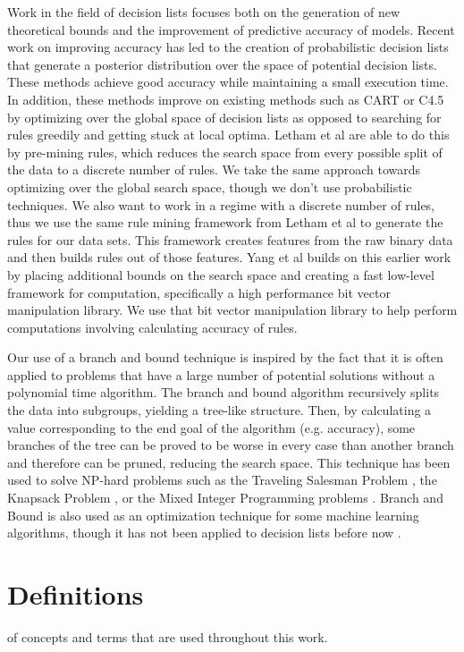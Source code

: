 \documentclass[]{report}
\theoremstyle{definition}
\begin{document}
Work in the field of decision lists focuses both on the generation of new theoretical bounds and the improvement of predictive accuracy of models.
Recent work on improving accuracy has led to the creation of probabilistic decision lists that generate a posterior distribution over the space of potential decision lists\cite{LethamRuMcMa15,YangRuSe16}.
These methods achieve good accuracy while maintaining a small execution time.
In addition, these methods improve on existing methods such as CART or C4.5 by optimizing over the global space of decision lists as opposed to searching for rules greedily and getting stuck at local optima.
Letham et al are able to do this by pre-mining rules, which reduces the search space from every possible split of the data to a discrete number of rules.
We take the same approach towards optimizing over the global search space, though we don’t use probabilistic techniques.
We also want to work in a regime with a discrete number of rules, thus we use the same rule mining framework from Letham et al to generate the rules for our data sets.
This framework creates features from the raw binary data and then builds rules out of those features.
Yang et al builds on this earlier work by placing additional bounds on the search space and creating a fast low-level framework for computation, specifically a high performance bit vector manipulation library.
We use that bit vector manipulation library to help perform computations involving calculating accuracy of rules.

Our use of a branch and bound technique is inspired by the fact that it is often applied to problems that have a large number of potential solutions without a polynomial time algorithm.
The branch and bound algorithm recursively splits the data into subgroups, yielding a tree-like structure.
Then, by calculating a value corresponding to the end goal of the algorithm (e.g. accuracy), some branches of the tree can be proved to be worse in every case than another branch and therefore can be pruned, reducing the search space.
This technique has been used to solve NP-hard problems such as the Traveling Salesman Problem \cite{LittleMuSwKa63}, the Knapsack Problem \cite{Kolesar67}, or the Mixed Integer Programming problems \cite{Clausen99}.
Branch and Bound is also used as an optimization technique for some machine learning algorithms, though it has not been applied to decision lists before now \cite{ChapelleSiKe06}.

\chapter{Definitions}\label{ch:definitions}
 of concepts and terms that are used throughout this work.
\end{document}
